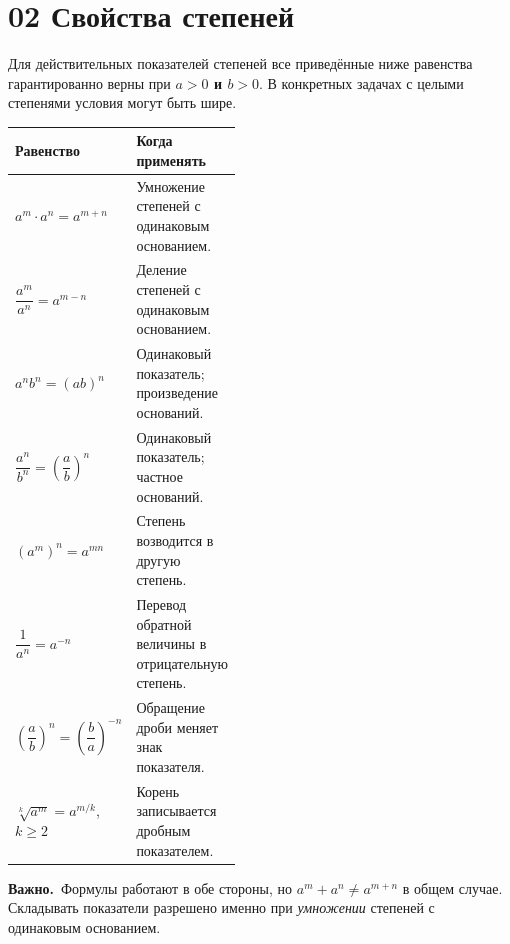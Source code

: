 \documentclass[a4paper,12pt]{article}
\newcommand{\key}[1]{\textbf{\textcolor{darkaccent}{#1}}}
\newcommand{\attention}[1]{\medskip\noindent\textcolor{darkaccent}{\bfseries Важно.}\ #1\par\medskip}
\begin{document}
\section*{02 \quad Свойства степеней}
Для действительных показателей степеней все приведённые ниже равенства гарантированно верны при \key{$a>0$ и $b>0$}. В конкретных задачах с целыми степенями условия могут быть шире.
\renewcommand{\arraystretch}{1.35}
\begin{center}
\small
\begin{tabularx}{\linewidth}{@{}p{0.45\linewidth}X@{}}
\toprule
\textbf{Равенство} & \textbf{Когда применять} \\
\midrule
$a^m\cdot a^n=a^{m+n}$ & Умножение степеней с одинаковым основанием. \\
$\dfrac{a^m}{a^n}=a^{m-n}$ & Деление степеней с одинаковым основанием. \\
$a^n b^n=(ab)^n$ & Одинаковый показатель; произведение оснований. \\
$\dfrac{a^n}{b^n}=\left(\dfrac ab\right)^n$ & Одинаковый показатель; частное оснований. \\
$(a^m)^n=a^{mn}$ & Степень возводится в другую степень. \\
$\dfrac1{a^n}=a^{-n}$ & Перевод обратной величины в отрицательную степень. \\
$\left(\dfrac ab\right)^n=\left(\dfrac ba\right)^{-n}$ & Обращение дроби меняет знак показателя. \\
$\sqrt[k]{a^m}=a^{m/k}$, $k\ge2$ & Корень записывается дробным показателем. \\
\bottomrule
\end{tabularx}
\end{center}
\attention{Формулы работают в обе стороны, но $a^m+a^n\ne a^{m+n}$ в общем случае. Складывать показатели разрешено именно при \emph{умножении} степеней с одинаковым основанием.}

\clearpage
\end{document}

